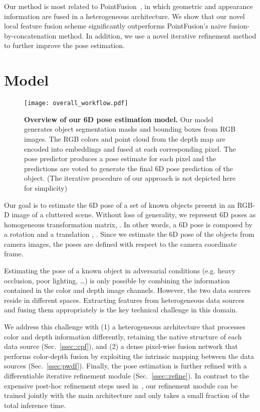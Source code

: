 \documentclass[10pt,twocolumn,letterpaper]{article}
\begin{document}
Our method is most related to PointFusion~\cite{xu2017pointfusion}, in which geometric and appearance information are fused in a heterogeneous architecture. We show that our novel local feature fusion scheme significantly outperforms PointFusion's naive fusion-by-concatenation method. In addition, we use a novel iterative refinement method to further improve the pose estimation.

\section{Model}
\begin{figure*}[ht]
	\centering
	\texttt{[image: overall\_workflow.pdf]}
	\caption{\textbf{Overview of our 6D pose estimation model.} Our model generates object segmentation masks and bounding boxes from RGB images. The RGB colors and point cloud from the depth map are encoded into embeddings and fused at each corresponding pixel. The pose predictor produces a pose estimate for each pixel and the predictions are voted to generate the final 6D pose prediction of the object. (The iterative procedure of our approach is not depicted here for simplicity)}
	\label{fig:overall}
\end{figure*}

Our goal is to estimate the 6D pose of a set of known objects present in an RGB-D image of a cluttered scene.
Without loss of generality, we represent 6D poses as homogeneous transformation matrix, . 
In other words, a 6D pose is composed by a rotation  and a translation , .
Since we estimate the 6D pose of the objects from camera images, the poses are defined with respect to the camera coordinate frame.

Estimating the pose of a known object in adversarial conditions (e.g. heavy occlusion, poor lighting, \ldots) is only possible by combining the information contained in the color and depth image channels. 
However, the two data sources reside in different spaces. Extracting features from heterogeneous data sources and fusing them appropriately is the key technical challenge in this domain. 

We address this challenge with (1) a heterogeneous architecture that processes color and depth information differently, retaining the native structure of each data source (Sec.~\ref{ssec::cpf}), and (2) a dense pixel-wise fusion network that performs color-depth fusion by exploiting the intrinsic mapping between the data sources (Sec.~\ref{ssec:pwdf}). Finally, the pose estimation is further refined with a differentiable iterative refinement module (Sec.~\ref{ssec::refine}). In contrast to the expensive post-hoc refinement steps used in~\cite{xiang2017posecnn,li2018unified}, our refinement module can be trained jointly with the main architecture and only takes a small fraction of the total inference time.
\end{document}
